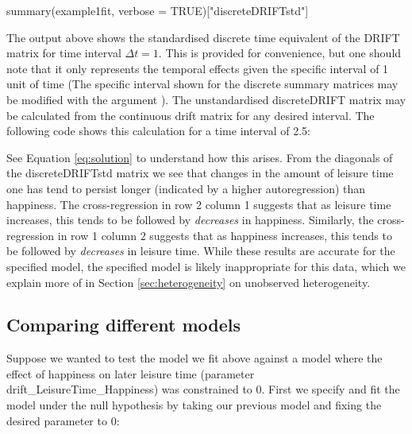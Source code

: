 \documentclass[nojss]{jss}\usepackage[]{graphicx}\usepackage[]{color}
\begin{document}
\begin{Schunk}
\begin{Sinput}
summary(example1fit, verbose = TRUE)["discreteDRIFTstd"]
\end{Sinput}
\end{Schunk}

The output above shows the standardised discrete time equivalent of the DRIFT matrix for time interval $\Delta t = 1$. This is provided for convenience, but one should note that it only represents the temporal effects given the specific interval of 1 unit of time (The specific interval shown for the discrete summary matrices may be modified with the argument ).  The unstandardised discreteDRIFT matrix may be calculated from the continuous drift matrix for any desired interval. The following code shows this calculation for a time interval of 2.5: 

\begin{Schunk}
\end{Schunk}

See Equation \ref{eq:solution} to understand how this arises. From the diagonals of the discreteDRIFTstd matrix we see that changes in the amount of leisure time one has tend to persist longer (indicated by a higher autoregression) than happiness. The cross-regression in row 2 column 1 suggests that as leisure time increases, this tends to be followed by \textit{decreases} in happiness. Similarly, the cross-regression in row 1 column 2 suggests that as happiness increases, this tends to be followed by \textit{decreases} in leisure time. While these results are accurate for the specified model, the specified model is likely inappropriate for this data, which we explain more of in Section \ref{sec:heterogeneity} on unobserved heterogeneity.

\subsection{Comparing different models} \label{sec:testing}\nopagebreak
Suppose we wanted to test the model we fit above against a model where the effect of happiness on later leisure time (parameter drift\_LeisureTime\_Happiness) was constrained to 0. First we specify and fit the model under the null hypothesis by taking our previous model and fixing the desired parameter to 0:
\end{document}
